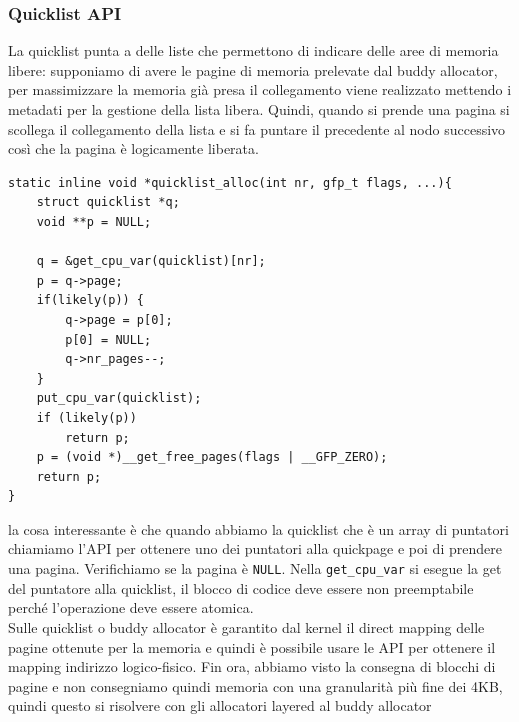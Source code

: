 \documentclass[12pt, oneside]{extbook}
\begin{document}
\subsubsection{Quicklist API}
La quicklist punta a delle liste che permettono di indicare delle aree di memoria libere: supponiamo di avere le pagine di memoria prelevate dal buddy allocator, per massimizzare la memoria già presa il collegamento viene realizzato mettendo i metadati per la gestione della lista libera. Quindi, quando si prende una pagina si scollega il collegamento della lista e si fa puntare il precedente al nodo successivo così che la pagina è logicamente liberata.
\begin{lstlisting}
static inline void *quicklist_alloc(int nr, gfp_t flags, ...){
	struct quicklist *q;
	void **p = NULL;
	
	q = &get_cpu_var(quicklist)[nr];
	p = q->page;
	if(likely(p)) {
		q->page = p[0];
		p[0] = NULL;
		q->nr_pages--;
	}
	put_cpu_var(quicklist);
	if (likely(p))
		return p;
	p = (void *)__get_free_pages(flags | __GFP_ZERO);
	return p;
}
\end{lstlisting}
la cosa interessante è che quando abbiamo la quicklist che è un array di puntatori chiamiamo l'API per ottenere uno dei puntatori alla quickpage e poi di prendere una pagina. Verifichiamo se la pagina è \texttt{NULL}. Nella \texttt{get\_cpu\_var} si esegue la get del puntatore alla quicklist, il blocco di codice deve essere non preemptabile perché l'operazione deve essere atomica.\\Sulle quicklist o buddy allocator è garantito dal kernel il direct mapping delle pagine ottenute per la memoria e quindi è possibile usare le API per ottenere il mapping indirizzo logico-fisico. Fin ora, abbiamo visto la consegna di blocchi di pagine e non consegniamo quindi memoria con una granularità più fine dei 4KB, quindi questo si risolvere con gli allocatori layered al buddy allocator
\end{document}
